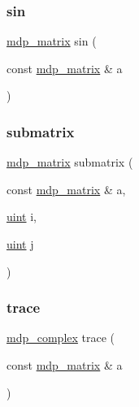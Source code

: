 \mbox{\label{classmdp__matrix_ae7a9b12e9cedc3d6f274c9fe9eb44332}} 
\subsubsection{\texorpdfstring{sin}{sin}}
{\footnotesize\ttfamily \hyperlink{classmdp__matrix}{mdp\+\_\+matrix} sin (\begin{DoxyParamCaption}\item[{const \hyperlink{classmdp__matrix}{mdp\+\_\+matrix} \&}]{a }\end{DoxyParamCaption})\hspace{0.3cm}{\ttfamily [friend]}}

\mbox{\label{classmdp__matrix_a28a3f69388892b5b30aad614ed75e375}} 
\subsubsection{\texorpdfstring{submatrix}{submatrix}}
{\footnotesize\ttfamily \hyperlink{classmdp__matrix}{mdp\+\_\+matrix} submatrix (\begin{DoxyParamCaption}\item[{const \hyperlink{classmdp__matrix}{mdp\+\_\+matrix} \&}]{a,  }\item[{\hyperlink{mdp__global__vars_8h_a91ad9478d81a7aaf2593e8d9c3d06a14}{uint}}]{i,  }\item[{\hyperlink{mdp__global__vars_8h_a91ad9478d81a7aaf2593e8d9c3d06a14}{uint}}]{j }\end{DoxyParamCaption})\hspace{0.3cm}{\ttfamily [friend]}}

\mbox{\label{classmdp__matrix_a5336fdab3a6eaa9888c91833f251f4e0}} 
\subsubsection{\texorpdfstring{trace}{trace}}
{\footnotesize\ttfamily \hyperlink{classmdp__complex}{mdp\+\_\+complex} trace (\begin{DoxyParamCaption}\item[{const \hyperlink{classmdp__matrix}{mdp\+\_\+matrix} \&}]{a }\end{DoxyParamCaption})\hspace{0.3cm}{\ttfamily [friend]}}

